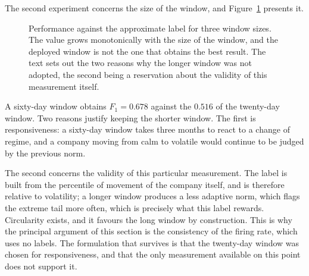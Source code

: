 The second experiment concerns the size of the window, and Figure~\ref{fig:av_janela} presents
it.

\begin{figure}[htbp]
\centering
{}
\caption[Ablation on the size of the window]{Performance against the approximate label for three
window sizes. The value grows monotonically with the size of the window, and the deployed window is
not the one that obtains the best result. The text sets out the two reasons why the longer window
was not adopted, the second being a reservation about the validity of this measurement itself.}
\label{fig:av_janela}
\end{figure}

A sixty-day window obtains $F_1 = 0.678$ against the $0.516$ of the twenty-day window. Two reasons
justify keeping the shorter window. The first is responsiveness: a sixty-day window takes three
months to react to a change of regime, and a company moving from calm to volatile would continue to
be judged by the previous norm.

The second concerns the validity of this particular measurement. The label is built from the
percentile of movement of the company itself, and is therefore relative to volatility; a longer
window produces a less adaptive norm, which flags the extreme tail more often, which is precisely
what this label rewards. Circularity exists, and it favours the long window by construction. This
is why the principal argument of this section is the consistency of the firing rate, which uses no
labels. The formulation that survives is that the twenty-day window was chosen for responsiveness,
and that the only measurement available on this point does not support it.

